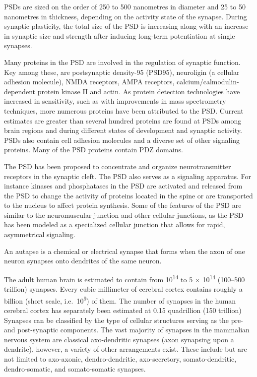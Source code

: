 PSDs are sized on the order of 250 to 500 nanometres in diameter and 25 to 50 nanometres in thickness, depending on the activity state of the synapse. During synaptic plasticity, the total size of the PSD is increasing along with an increase in synaptic size and strength after inducing long-term potentiation at single synapses.

Many proteins in the PSD are involved in the regulation of synaptic function. Key among these, are postsynaptic density-95 (PSD95), neuroligin (a cellular adhesion molecule), NMDA receptors, AMPA receptors, calcium/calmodulin-dependent protein kinase II and actin. As protein detection technologies have increased in sensitivity, such as with improvements in mass spectrometry techniques, more numerous proteins have been attributed to the PSD. Current estimates are greater than several hundred proteins are found at PSDs among brain regions and during different states of development and synaptic activity. PSDs also contain cell adhesion molecules and a diverse set of other signaling proteins. Many of the PSD proteins contain PDZ domains.

The PSD has been proposed to concentrate and organize neurotransmitter receptors in the synaptic cleft. The PSD also serves as a signaling apparatus. For instance kinases and phosphatases in the PSD are activated and released from the PSD to change the activity of proteins located in the spine or are transported to the nucleus to affect protein synthesis. Some of the features of the PSD are similar to the neuromuscular junction and other cellular junctions, as the PSD has been modeled as a specialized cellular junction that allows for rapid, asymmetrical signaling.

An autapse is a chemical or electrical synapse that forms when the axon of one neuron synapses onto dendrites of the same neuron.

The adult human brain is estimated to contain from 10\textsuperscript{14} to 5 × 10\textsuperscript{14} (100--500 trillion) synapses. Every cubic millimeter of cerebral cortex contains roughly a billion (short scale, i.e.~10\textsuperscript{9}) of them. The number of synapses in the human cerebral cortex has separately been estimated at 0.15 quadrillion (150 trillion)
Synapses can be classified by the type of cellular structures serving as the pre- and post-synaptic components. The vast majority of synapses in the mammalian nervous system are classical axo-dendritic synapses (axon synapsing upon a dendrite), however, a variety of other arrangements exist. These include but are not limited to axo-axonic, dendro-dendritic, axo-secretory, somato-dendritic, dendro-somatic, and somato-somatic synapses.

